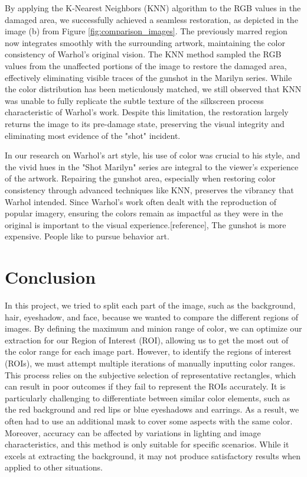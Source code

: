 \documentclass{article}
\begin{document}
By applying the K-Nearest Neighbors (KNN) algorithm to the RGB values in the damaged area, we successfully achieved a seamless restoration, as depicted in the image (b) from Figure \ref{fig:comparison_images}. The previously marred region now integrates smoothly with the surrounding artwork, maintaining the color consistency of Warhol’s original vision. The KNN method sampled the RGB values from the unaffected portions of the image to restore the damaged area, effectively eliminating visible traces of the gunshot in the Marilyn series. While the color distribution has been meticulously matched, we still observed that KNN was unable to fully replicate the subtle texture of the silkscreen process characteristic of Warhol’s work. Despite this limitation, the restoration largely returns the image to its pre-damage state, preserving the visual integrity and eliminating most evidence of the "shot" incident.

In our research on Warhol's art style, his use of color was crucial to his style, and the vivid hues in the "Shot Marilyn" series are integral to the viewer's experience of the artwork. Repairing the gunshot area, especially when restoring color consistency through advanced techniques like KNN, preserves the vibrancy that Warhol intended. Since Warhol’s work often dealt with the reproduction of popular imagery, ensuring the colors remain as impactful as they were in the original is important to the visual experience.[reference], The gunshot is more expensive. People like to pursue behavior art. 






\hypertarget{conclusion}{%
\section{Conclusion}\label{conclusion}}

In this project, we tried to split each part of the image, such as the
background, hair, eyeshadow, and face, because we wanted to compare the
different regions of images. By defining the maximum and minion range of
color, we can optimize our extraction for our Region of Interest (ROI),
allowing us to get the most out of the color range for each image part.
However, to identify the regions of interest (ROIs), we must attempt
multiple iterations of manually inputting color ranges. This process
relies on the subjective selection of representative rectangles, which
can result in poor outcomes if they fail to represent the ROIs
accurately. It is particularly challenging to differentiate between
similar color elements, such as the red background and red lips or blue
eyeshadows and earrings. As a result, we often had to use an additional
mask to cover some aspects with the same color. Moreover, accuracy can
be affected by variations in lighting and image characteristics, and
this method is only suitable for specific scenarios. While it excels at
extracting the background, it may not produce satisfactory results when
applied to other situations.
\end{document}
